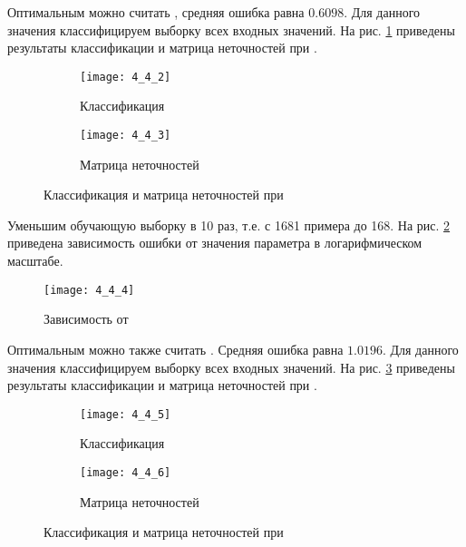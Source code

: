 Оптимальным можно считать , средняя ошибка равна $0.6098$. Для данного значения классифицируем выборку всех входных значений. На рис. \ref{fig:4_4_2} приведены результаты классификации и матрица неточностей при .
\vspace{-1cm}
\begin{figure}[H]
\begin{center}
	\begin{subfigure}{0.49\textwidth}
		\texttt{[image: 4\_4\_2]}
		\caption{Классификация}
	\end{subfigure}
	\begin{subfigure}{0.47\textwidth}
		\texttt{[image: 4\_4\_3]}
		\caption{Матрица неточностей}
	\end{subfigure}
	\caption{Классификация и матрица неточностей при }
	\label{fig:4_4_2}
\end{center}
\end{figure}

Уменьшим обучающую выборку в 10 раз, т.е. с 1681 примера до 168. На рис. \ref{fig:4_4_4} приведена зависимость ошибки  от значения параметра  в логарифмическом масштабе.
\vspace{-0.5cm} 
\begin{figure}[H]
\begin{center}
	\texttt{[image: 4\_4\_4]}
	\caption{Зависимость  от }
	\label{fig:4_4_4}
\end{center}
\end{figure}
\vspace{-0.5cm}

Оптимальным можно также считать . Средняя ошибка равна $1.0196$. Для данного значения классифицируем выборку всех входных значений. На рис. \ref{fig:4_4_5} приведены результаты классификации и матрица неточностей при .
\vspace{-1cm}
\begin{figure}[H]
\begin{center}
	\begin{subfigure}{0.49\textwidth}
		\texttt{[image: 4\_4\_5]}
		\caption{Классификация}
	\end{subfigure}
	\begin{subfigure}{0.49\textwidth}
		\texttt{[image: 4\_4\_6]}
		\caption{Матрица неточностей}
	\end{subfigure}
	\caption{Классификация и матрица неточностей при }
	\label{fig:4_4_5}
\end{center}
\end{figure}

